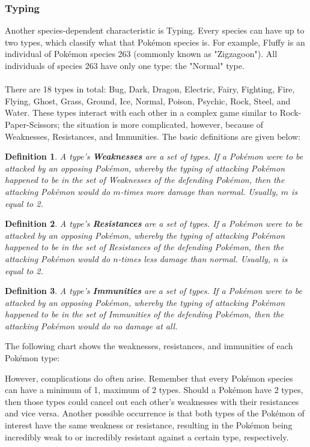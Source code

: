 \documentclass{article}
\newtheorem{definition}{Definition}
\begin{document}
\subsubsection{Typing}
Another species-dependent characteristic is Typing. Every species can have up to two types, which classify what that Pok\'emon species is. For example, Fluffy is an individual of Pok\'emon species 263 (commonly known as "Zigzagoon"). All individuals of species 263 have only one type: the "Normal" type.\\\\
There are 18 types in total: Bug, Dark, Dragon, Electric, Fairy, Fighting, Fire, Flying, Ghost, Grass, Ground, Ice, Normal, Poison, Psychic, Rock, Steel, and Water. These types interact with each other in a complex game similar to Rock-Paper-Scissors; the situation is more complicated, however, because of Weaknesses, Resistances, and Immunities. The basic definitions are given below:
\begin{definition}
	A type's \textbf{Weaknesses} are a set of types. If a Pok\'emon were to be attacked by an opposing Pok\'emon, whereby the typing of attacking Pok\'emon happened to be in the set of Weaknesses of the defending Pok\'emon, then the attacking Pok\'emon would do $m$-times more damage than normal. Usually, $m$ is equal to 2.
\end{definition}
\begin{definition}
	A type's \textbf{Resistances} are a set of types. If a Pok\'emon were to be attacked by an opposing Pok\'emon, whereby the typing of attacking Pok\'emon happened to be in the set of Resistances of the defending Pok\'emon, then the attacking Pok\'emon would do $n$-times less damage than normal. Usually, $n$ is equal to 2.
\end{definition}
\begin{definition}
	A type's \textbf{Immunities} are a set of types. If a Pok\'emon were to be attacked by an opposing Pok\'emon, whereby the typing of attacking Pok\'emon happened to be in the set of Immunities of the defending Pok\'emon, then the attacking Pok\'emon would do no damage at all.
\end{definition}
The following chart shows the weaknesses, resistances, and immunities of each Pok\'emon type:
\begin{center}
\end{center}
However, complications do often arise. Remember that every Pok\'emon species can have a minimum of 1, maximum of 2 types. Should a Pok\'emon have 2 types, then those types could cancel out each other's weaknesses with their resistances and vice versa. Another possible occurrence is that both types of the Pok\'emon of interest have the same weakness or resistance, resulting in the Pok\'emon being incredibly weak to or incredibly resistant against a certain type, respectively.\\\\
\end{document}
